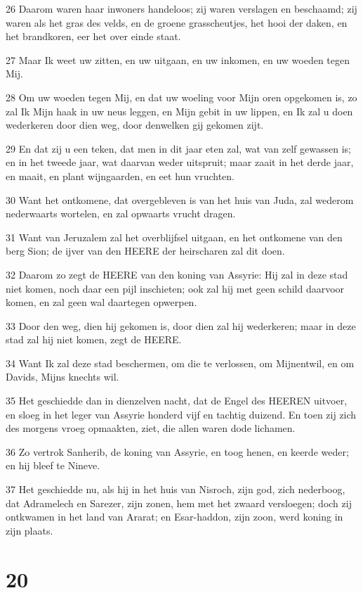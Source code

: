 \par 26 Daarom waren haar inwoners handeloos; zij waren verslagen en beschaamd; zij waren als het gras des velds, en de groene grasscheutjes, het hooi der daken, en het brandkoren, eer het over einde staat.
\par 27 Maar Ik weet uw zitten, en uw uitgaan, en uw inkomen, en uw woeden tegen Mij.
\par 28 Om uw woeden tegen Mij, en dat uw woeling voor Mijn oren opgekomen is, zo zal Ik Mijn haak in uw neus leggen, en Mijn gebit in uw lippen, en Ik zal u doen wederkeren door dien weg, door denwelken gij gekomen zijt.
\par 29 En dat zij u een teken, dat men in dit jaar eten zal, wat van zelf gewassen is; en in het tweede jaar, wat daarvan weder uitspruit; maar zaait in het derde jaar, en maait, en plant wijngaarden, en eet hun vruchten.
\par 30 Want het ontkomene, dat overgebleven is van het huis van Juda, zal wederom nederwaarts wortelen, en zal opwaarts vrucht dragen.
\par 31 Want van Jeruzalem zal het overblijfsel uitgaan, en het ontkomene van den berg Sion; de ijver van den HEERE der heirscharen zal dit doen.
\par 32 Daarom zo zegt de HEERE van den koning van Assyrie: Hij zal in deze stad niet komen, noch daar een pijl inschieten; ook zal hij met geen schild daarvoor komen, en zal geen wal daartegen opwerpen.
\par 33 Door den weg, dien hij gekomen is, door dien zal hij wederkeren; maar in deze stad zal hij niet komen, zegt de HEERE.
\par 34 Want Ik zal deze stad beschermen, om die te verlossen, om Mijnentwil, en om Davids, Mijns knechts wil.
\par 35 Het geschiedde dan in dienzelven nacht, dat de Engel des HEEREN uitvoer, en sloeg in het leger van Assyrie honderd vijf en tachtig duizend. En toen zij zich des morgens vroeg opmaakten, ziet, die allen waren dode lichamen.
\par 36 Zo vertrok Sanherib, de koning van Assyrie, en toog henen, en keerde weder; en hij bleef te Nineve.
\par 37 Het geschiedde nu, als hij in het huis van Nisroch, zijn god, zich nederboog, dat Adramelech en Sarezer, zijn zonen, hem met het zwaard versloegen; doch zij ontkwamen in het land van Ararat; en Esar-haddon, zijn zoon, werd koning in zijn plaats.

\chapter{20}

